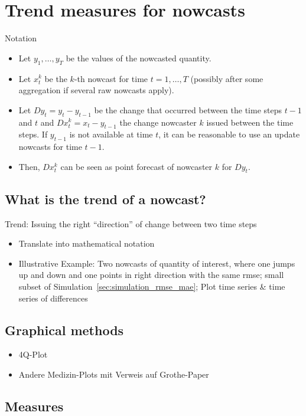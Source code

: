 \documentclass[oneside]{article}
\theoremstyle{plain}%
\theoremstyle{definition}
\newcommand{\ydiff}{D y}
\newcommand{\xdiff}{Dx}
\begin{document}
\section{Trend measures for nowcasts}

Notation
\begin{itemize}
  \item Let $y_1, \ldots, y_T$ be the values of the nowcasted quantity.
  \item Let $x_t^k$ be the $k$-th nowcast for time $t = 1, \ldots, T$ (possibly after some aggregation if several raw nowcasts apply).
  \item Let $\ydiff_t = y_t - y_{t-1}$ be the change that occurred between the time steps $t-1$ and $t$ and $\xdiff_t^k = x_t - y_{t-1}$ the change nowcaster $k$ issued between the time steps. If $y_{t-1}$ is not available at time $t$, it can be reasonable to use an update nowcasts for time $t-1$.
  \item Then, $\xdiff_t^k$ can be seen as point forecast of nowcaster $k$ for $\ydiff_t$. 
\end{itemize}

\subsection{What is the trend of a nowcast?}

Trend: Issuing the right \enquote{direction} of change between two time steps

\begin{itemize}
  \item Translate into mathematical notation
  \item Illustrative Example: Two nowcasts of quantity of interest, where one jumps up and down and one points in right direction with the same rmse; small subset of Simulation~\ref{sec:simulation_rmse_mae}; Plot time series \& time series of differences
\end{itemize}

\subsection{Graphical methods}


\begin{itemize}
  \item 4Q-Plot
  \item Andere Medizin-Plots mit Verweis auf Grothe-Paper
\end{itemize}


\subsection{Measures}
\end{document}
